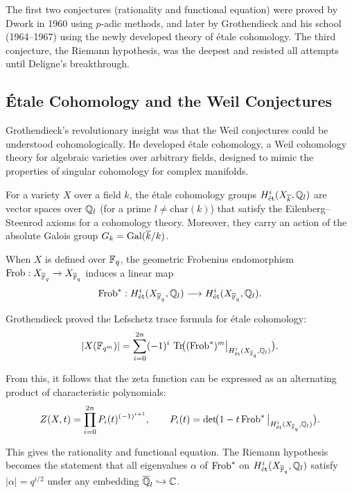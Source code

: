 The first two conjectures (rationality and functional equation) were proved by Dwork in 1960 using \(p\)-adic methods, and later by Grothendieck and his school (1964--1967) using the newly developed theory of \'etale cohomology. The third conjecture, the Riemann hypothesis, was the deepest and resisted all attempts until Deligne's breakthrough.

\subsection{\'Etale Cohomology and the Weil Conjectures}

Grothendieck's revolutionary insight was that the Weil conjectures could be understood cohomologically. He developed \'etale cohomology, a Weil cohomology theory for algebraic varieties over arbitrary fields, designed to mimic the properties of singular cohomology for complex manifolds.

For a variety \(X\) over a field \(k\), the \'etale cohomology groups \(H^i_{\text{\'et}}(X_{\overline{k}}, \mathbb{Q}_l)\) are vector spaces over \(\mathbb{Q}_l\) (for a prime \(l \neq \text{char}(k)\)) that satisfy the Eilenberg--Steenrod axioms for a cohomology theory. Moreover, they carry an action of the absolute Galois group \(G_k = \operatorname{Gal}(\overline{k}/k)\).

When \(X\) is defined over \(\mathbb{F}_q\), the geometric Frobenius endomorphism \(\operatorname{Frob}: X_{\overline{\mathbb{F}}_q} \to X_{\overline{\mathbb{F}}_q}\) induces a linear map
\[
\operatorname{Frob}^*: H^i_{\text{\'et}}(X_{\overline{\mathbb{F}}_q}, \mathbb{Q}_l) \longrightarrow H^i_{\text{\'et}}(X_{\overline{\mathbb{F}}_q}, \mathbb{Q}_l).
\]

Grothendieck proved the Lefschetz trace formula for \'etale cohomology:
\[
|X(\mathbb{F}_{q^m})| = \sum_{i=0}^{2n} (-1)^i \, \operatorname{Tr}\!\bigl( (\operatorname{Frob}^*)^m \big|_{H^i_{\text{\'et}}(X_{\overline{\mathbb{F}}_q}, \mathbb{Q}_l)} \bigr).
\]

From this, it follows that the zeta function can be expressed as an alternating product of characteristic polynomials:
\[
Z(X, t) = \prod_{i=0}^{2n} P_i(t)^{(-1)^{i+1}}, \qquad
P_i(t) = \det\!\bigl( 1 - t \operatorname{Frob}^* \big|_{H^i_{\text{\'et}}(X_{\overline{\mathbb{F}}_q}, \mathbb{Q}_l)} \bigr).
\]

This gives the rationality and functional equation. The Riemann hypothesis becomes the statement that all eigenvalues \(\alpha\) of \(\operatorname{Frob}^*\) on \(H^i_{\text{\'et}}(X_{\overline{\mathbb{F}}_q}, \mathbb{Q}_l)\) satisfy \(|\alpha| = q^{i/2}\) under any embedding \(\overline{\mathbb{Q}}_l \hookrightarrow \mathbb{C}\).


